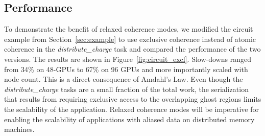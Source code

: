 \subsection{Performance}
\label{subsec:relaxedperf}

To demonstrate the benefit of relaxed coherence modes, we modified the circuit example from Section~\ref{sec:example}
to use exclusive coherence instead of atomic coherence in the {\em distribute\_charge} task and compared 
the performance of the two versions.
The results are shown in Figure~\ref{fig:circuit_excl}.  Slow-downs ranged from 34\% on 48-GPUs to 67\% on 
96 GPUs and more importantly scaled with node count.  This is a direct consequence of Amdahl's Law.  
Even though the {\em distribute\_charge} tasks are a small fraction of the total work, the serialization 
that results from requiring exclusive access to the 
overlapping ghost regions limits the scalability of the application.  Relaxed coherence modes will be 
imperative for enabling the scalability of applications with aliased data on distributed memory machines.



